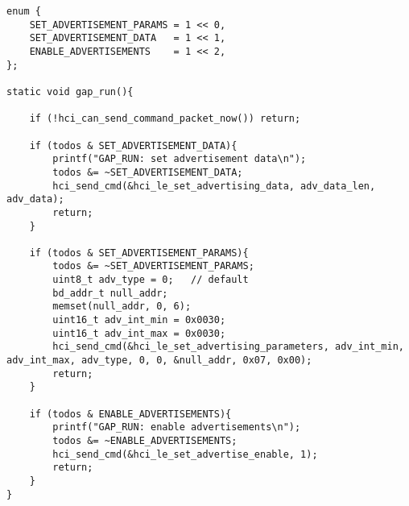 \begin{lstlisting}[float, caption= SPP\&LE client - GAP run., label=code:spp_le_gap_run]
enum {
    SET_ADVERTISEMENT_PARAMS = 1 << 0,
    SET_ADVERTISEMENT_DATA   = 1 << 1,
    ENABLE_ADVERTISEMENTS    = 1 << 2,
};

static void gap_run(){

    if (!hci_can_send_command_packet_now()) return;

    if (todos & SET_ADVERTISEMENT_DATA){
        printf("GAP_RUN: set advertisement data\n");
        todos &= ~SET_ADVERTISEMENT_DATA;
        hci_send_cmd(&hci_le_set_advertising_data, adv_data_len, adv_data);
        return;
    }    

    if (todos & SET_ADVERTISEMENT_PARAMS){
        todos &= ~SET_ADVERTISEMENT_PARAMS;
        uint8_t adv_type = 0;   // default
        bd_addr_t null_addr;
        memset(null_addr, 0, 6);
        uint16_t adv_int_min = 0x0030;
        uint16_t adv_int_max = 0x0030;
        hci_send_cmd(&hci_le_set_advertising_parameters, adv_int_min, adv_int_max, adv_type, 0, 0, &null_addr, 0x07, 0x00);
        return;
    }    

    if (todos & ENABLE_ADVERTISEMENTS){
        printf("GAP_RUN: enable advertisements\n");
        todos &= ~ENABLE_ADVERTISEMENTS;
        hci_send_cmd(&hci_le_set_advertise_enable, 1);
        return;
    }
}
\end{lstlisting}

